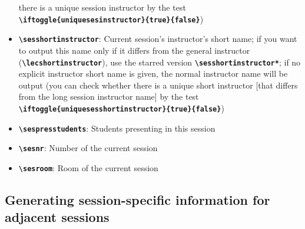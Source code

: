 \documentclass[english]{article}
\newcommand*\jmacro[1]{\textbf{\texttt{#1}}}
\newcommand*\jcsmacro[1]{\jmacro{\textbackslash{#1}}}
\newcommand*\jparam[1]{\angus #1\angud}
\begin{document}
\begin{itemize}
there is a unique session instructor by the test
\jcsmacro{iftoggle\{uniquesesinstructor\}\{\jparam{true}\}\{\jparam{false}\}})
\item \jcsmacro{sesshortinstructor}: Current session's instructor's short name; if you want to output this name only if it differs from the general instructor (\jcsmacro{lecshortinstructor}), use the starred version \jcsmacro{sesshortinstructor*}; if no explicit instructor short name is given, the normal instructor name will be output (you can check whether
there is a unique short instructor [that differs from the long session instructor name] by the test
\jcsmacro{iftoggle\{uniquesesshortinstructor\}\{\jparam{true}\}\{\jparam{false}\}})
\item \jcsmacro{sespresstudents}: Students presenting in this session
\item \jcsmacro{sesnr}: Number of the current session
\item \jcsmacro{sesroom}: Room of the current session
\end{itemize}

\subsection{Generating session-specific information for adjacent sessions}
\end{document}
